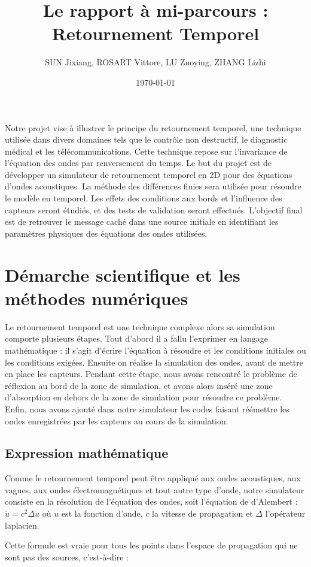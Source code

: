 \documentclass[11pt, a4paper]{article}
\title{Le rapport à mi-parcours : Retournement Temporel}
\author{SUN Jixiang, ROSART Vittore, LU Zuoying, ZHANG Lizhi}
\date{\today}
\begin{document}
\maketitle
\thispagestyle{fancy}


Notre projet vise à illustrer le principe du retournement temporel, une technique utilisée dans divers domaines tels que le contrôle non destructif, le diagnostic médical et les télécommunications. Cette technique repose sur l'invariance de l'équation des ondes par renversement du temps. Le but du projet est de développer un simulateur de retournement temporel en 2D pour des équations d'ondes acoustiques. La méthode des différences finies sera utilisée pour résoudre le modèle en temporel. Les effets des conditions aux bords et l'influence des capteurs seront étudiés, et des tests de validation seront effectués. L'objectif final est de retrouver le message caché dans une source initiale en identifiant les paramètres physiques des équations des ondes utilisées.

\section{Démarche scientifique et les méthodes numériques}
Le retournement temporel est une technique complexe alors sa simulation comporte plusieurs étapes. Tout d'abord il a fallu l'exprimer en langage mathématique : il s'agit d'écrire l'équation à résoudre et les conditions initiales ou les conditions exigées. Ensuite on réalise la simulation des ondes, avant de mettre en place les capteurs. Pendant cette étape, nous avons rencontré le problème de réflexion au bord de la zone de simulation, et avons alors inséré une zone d'absorption en dehors de la zone de simulation pour résoudre ce problème. Enfin, nous avons ajouté dans notre simulateur les codes faisant réémettre les ondes enregistrées par les capteurs au cours de la simulation.
\subsection{Expression mathématique}
Comme le retournement temporel peut être appliqué aux ondes acoustiques, aux vagues, aux ondes électromagnétiques et tout autre type d'onde, notre simulateur consiste en la résolution de l'équation des ondes, soit l'équation de d'Alembert : $\ddot{u}=c^2\Delta u $ où $u$ est la fonction d'onde, $c$ la vitesse de propagation et $\Delta$ l'opérateur laplacien.

Cette formule est vraie pour tous les points dans l'espace de propagation qui ne sont pas des sources, c'est-à-dire :
\end{document}

